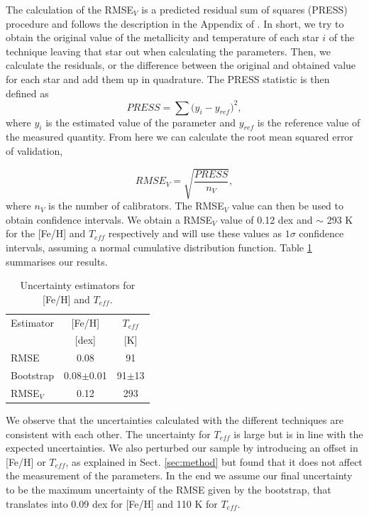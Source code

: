 \documentclass{aa}
\begin{document}
The calculation of the RMSE$_{V}$ is a predicted residual sum of squares (PRESS) procedure \citep{Weisberg-2005} and follows the description in the Appendix of \citet{Rojas-Ayala-2012}. In short, we try to obtain the original value of the metallicity and temperature of each star $i$ of the technique leaving that star out when calculating the parameters. Then, we calculate the residuals, or the difference between the original and obtained value for each star and add them up in quadrature. The PRESS statistic is then defined as 
\begin{equation}
PRESS = \sum{(y_{i}-y_{ref}})^{2},
\end{equation}
where $y_{i}$ is the estimated value of the parameter and $y_{ref}$ is the reference value of the measured quantity. From here we can calculate the root mean squared error of validation,

\begin{equation}
RMSE_{V} = \sqrt{\frac{PRESS}{n_{V}}},
\end{equation}
where $n_{V}$ is the number of calibrators. The RMSE$_{V}$ value can then be used to obtain confidence intervals. We obtain a RMSE$_{V}$ value of 0.12 dex and $\sim$ 293 K for the [Fe/H] and $T_{eff}$ respectively and will use these values as $1\sigma$ confidence intervals, assuming a normal cumulative distribution function. Table \ref{table:errors} summarises our results. 

\begin{table}[h!]
\centering
\caption[]{Uncertainty estimators for [Fe/H] and $T_{eff}$.}
\label{table:errors}
\begin{tabular}{l c c}
\hline
\hline
Estimator & [Fe/H] & $T_{eff}$ \\ 
                &  [dex]  &  [K] \\
\hline
RMSE & 0.08 & 91\\
Bootstrap & 0.08$\pm$0.01 & 91$\pm$13 \\
RMSE$_{V}$ & 0.12 & 293 \\
\hline
\hline
\end{tabular}
\end{table}

We observe that the uncertainties calculated with the different techniques are consistent with each other. The uncertainty for $T_{eff}$ is large but is in line with the expected uncertainties. We also perturbed our sample by introducing an offset in [Fe/H] or $T_{eff}$, as explained in Sect. \ref{sec:method} but found that it does not affect the measurement of the parameters. In the end we assume our final uncertainty to be the maximum uncertainty of the RMSE given by the bootstrap, that translates into 0.09 dex for [Fe/H] and 110 K for $T_{eff}$.   %
\end{document}
